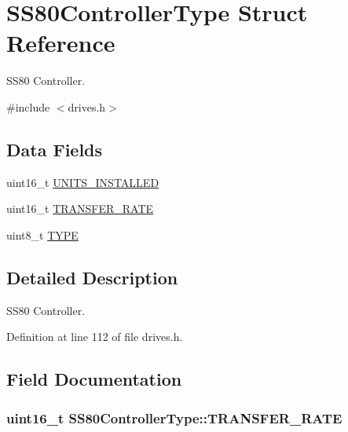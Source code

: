 \hypertarget{structSS80ControllerType}{}\section{S\+S80\+Controller\+Type Struct Reference}
\label{structSS80ControllerType}


S\+S80 Controller.  




{\ttfamily \#include $<$drives.\+h$>$}

\subsection*{Data Fields}
\begin{DoxyCompactItemize}
\item 
uint16\+\_\+t \hyperlink{structSS80ControllerType_a0868c32b362ef2af2ac64fa16aee8aae}{U\+N\+I\+T\+S\+\_\+\+I\+N\+S\+T\+A\+L\+L\+ED}
\item 
uint16\+\_\+t \hyperlink{structSS80ControllerType_a98a3f1a7de63398531426b5781cb0090}{T\+R\+A\+N\+S\+F\+E\+R\+\_\+\+R\+A\+TE}
\item 
uint8\+\_\+t \hyperlink{structSS80ControllerType_a255739680bca0ad3b4d1346cf5017332}{T\+Y\+PE}
\end{DoxyCompactItemize}


\subsection{Detailed Description}
S\+S80 Controller. 

Definition at line 112 of file drives.\+h.



\subsection{Field Documentation}
\subsubsection[{\texorpdfstring{T\+R\+A\+N\+S\+F\+E\+R\+\_\+\+R\+A\+TE}{TRANSFER_RATE}}]{\setlength{\rightskip}{0pt plus 5cm}uint16\+\_\+t S\+S80\+Controller\+Type\+::\+T\+R\+A\+N\+S\+F\+E\+R\+\_\+\+R\+A\+TE}\hypertarget{structSS80ControllerType_a98a3f1a7de63398531426b5781cb0090}{}\label{structSS80ControllerType_a98a3f1a7de63398531426b5781cb0090}


